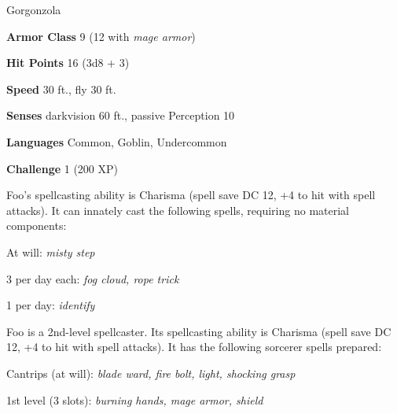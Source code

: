 \documentclass[letterpaper,twocolumn,openany]{memoir}
\begin{document}
\begin{RPGStatBlock}[float*=b,width=\textwidth + 8pt]{Gorgonzola}
	\begin{multicols}{2}

		\begin{RPGStatBlockDetails}
			\item \textbf{Armor Class} 9 (12 with \emph{mage armor})
			\item \textbf{Hit Points} 16 (3d8 + 3)
			\item \textbf{Speed} 30 ft., fly 30 ft.
		\end{RPGStatBlockDetails}
		

		\begin{RPGStatBlockDetails}
			\item \textbf{Senses} darkvision 60 ft., passive Perception 10
			\item \textbf{Languages} Common, Goblin, Undercommon
			\item \textbf{Challenge} 1 (200 XP)
		\end{RPGStatBlockDetails}

    	Foo's spellcasting ability is Charisma (spell save DC 12, +4 to hit with spell attacks).
		It can innately cast the following spells, requiring no material components:

		\begin{RPGStatBlockSpell}
			\item At will: \textit{misty step}
			\item 3 per day each: \textit{fog cloud, rope trick}
			\item 1 per day: \textit{identify}
		\end{RPGStatBlockSpell}

		Foo is a 2nd-level spellcaster. Its spellcasting ability is Charisma (spell save DC 12, +4 to hit with spell attacks). It has the following sorcerer spells prepared:
		
		\begin{RPGStatBlockSpell}
			\setlength{\leftmargin}{0pt}
			\item Cantrips (at will): \textit{blade ward, fire bolt, light, shocking grasp}
			\item 1st level (3 slots): \textit{burning hands, mage armor, shield}
		\end{RPGStatBlockSpell}


\end{multicols}
\end{RPGStatBlock}
\end{document}
